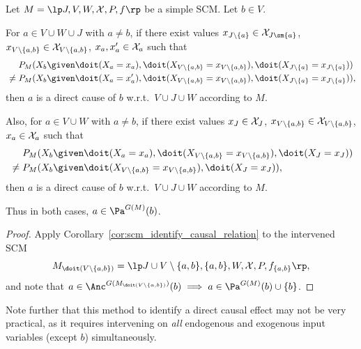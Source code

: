 \begin{Cor}\label{cor:scm_identify_direct_causal_relation}
  Let $M = \lt \Sin, \Send, \Srnd, \CX, P, f \rt$ be a simple SCM.
  Let $b \in V$.

  For $a \in V \cup W \cup J$ with $a \ne b$, if there exist values $x_{J\setminus\{a\}} \in \CX_{J\sm\{a\}}$, $x_{V\setminus\{a,b\}} \in \mathcal{X}_{V\setminus\{a,b\}}$, $x_a,x_a' \in \mathcal{X}_a$ such that
      \begin{equation*}\begin{split}
        & P_{M}(X_b \given \doit(X_a=x_a),\doit(X_{V\setminus\{a,b\}}=x_{V\setminus\{a,b\}}),\doit(X_{J\setminus \{a\}}=x_{J\setminus \{a\}})) \\
        {} \ne {} & P_{M}(X_b \given \doit(X_a=x_a'),\doit(X_{V\setminus\{a,b\}}=x_{V\setminus\{a,b\}}),\doit(X_{J\setminus\{a\}}=x_{J\setminus\{a\}})),
      \end{split}\end{equation*}
  then $a$ is a direct cause of $b$ w.r.t.\ $V \cup J \cup W$ according to $M$.

  Also, for $a \in V \cup W$ with $a \ne b$, if there exist values $x_J \in \mathcal{X}_J$, $x_{V\setminus\{a,b\}} \in \mathcal{X}_{V\setminus\{a,b\}}$, $x_a \in \mathcal{X}_a$ such that
      \begin{equation*}\begin{split}
        & P_{M}(X_b \given \doit(X_a=x_a),\doit(X_{V\setminus\{a,b\}}=x_{V\setminus\{a,b\}}),\doit(X_J=x_J)) \\
        {} \ne {} & P_{M}(X_b \given \doit(X_{V\setminus\{a,b\}}=x_{V\setminus\{a,b\}}),\doit(X_J=x_J)),
      \end{split}\end{equation*}
  then $a$ is a direct cause of $b$ w.r.t.\ $V \cup J \cup W$ according to $M$.
  
  Thus in both cases, $a \in \Pa^{G(M)}(b)$.
\end{Cor}
\begin{proof}
  Apply Corollary~\ref{cor:scm_identify_causal_relation} to the intervened SCM 
  $$M_{\doit(V\setminus\{a,b\})} = \lt J \cup V \setminus \{a,b\}, \{a,b\}, \Srnd, \CX, P, f_{\{a,b\}} \rt,$$
  and note that $a \in \Anc^{G(M_{\doit(V\setminus\{a,b\})})}(b) \implies a \in \Pa^{G(M)}(b) \cup \{b\}$.
\end{proof}
Note further that this method to identify a direct causal effect may not be very practical,
as it requires intervening on \emph{all} endogenous and exogenous input variables (except $b$) simultaneously.
  
